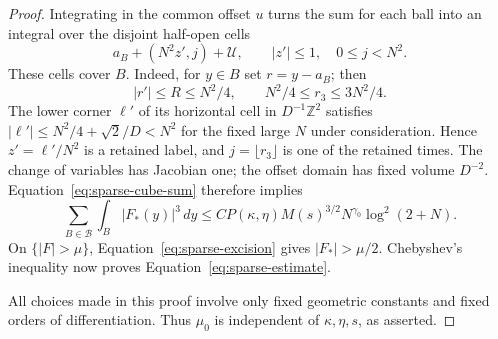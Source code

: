 \begin{proof}
Integrating in the common offset $u$ turns the sum for each ball
into an integral over the disjoint half-open cells
\[
 a_B+(N^2z',j)+\mathcal U,
 \qquad |z'|\leq1,\quad 0\leq j<N^2.
\]
These cells cover $B$.  Indeed, for $y\in B$ set $r=y-a_B$; then
\[
 |r'|\leq R\leq N^2/4,\qquad
 N^2/4\leq r_3\leq3N^2/4.
\]
The lower corner $\ell'$ of its horizontal cell in
$D^{-1}\mathbb Z^2$ satisfies
$|\ell'|\leq N^2/4+\sqrt2/D<N^2$ for the fixed large $N$ under
consideration.  Hence $z'=\ell'/N^2$ is a retained label, and
$j=\lfloor r_3\rfloor$ is one of the retained times.  The change
of variables has Jacobian one; the offset domain has fixed volume
$D^{-2}$.  Equation~\eqref{eq:sparse-cube-sum} therefore implies
\[
 \sum_{B\in\mathcal B}\int_B|F_*(y)|^3\,dy
 \leq C P(\kappa,\eta)M(s)^{3/2}
                         N^{\gamma_0}\log^2(2+N).
\]
On $\{|F|>\mu\}$, Equation~\eqref{eq:sparse-excision} gives
$|F_*|>\mu/2$.  Chebyshev's inequality now proves
Equation~\eqref{eq:sparse-estimate}.

All choices made in this proof involve only fixed geometric
constants and fixed orders of differentiation.  Thus $\mu_0$ is
independent of $\kappa,\eta,s$, as asserted.
\end{proof}
